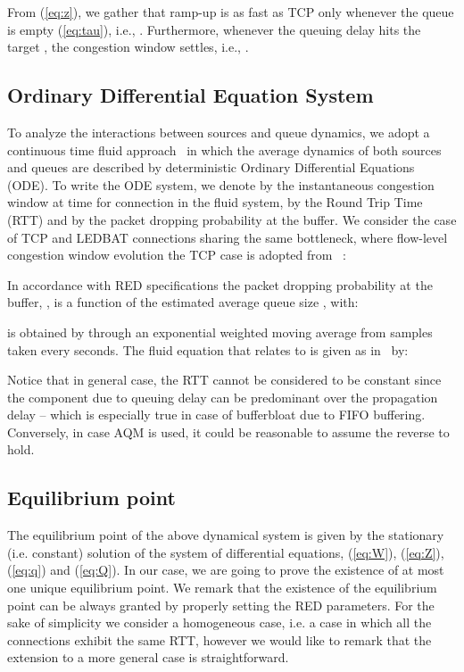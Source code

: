 \documentclass[conference]{IEEEtran}
\newcommand{\eqR}[1]{(\ref{eq:#1})}
\begin{document}
From \eqR{z}, we gather that ramp-up is as fast as TCP only whenever the queue is empty \eqR{tau}, i.e.,  . Furthermore, whenever the queuing delay hits the target ,  the congestion window settles, i.e., .


\subsection{Ordinary Differential Equation System} 

To analyze the interactions between sources and queue dynamics, we adopt a continuous time fluid approach~\cite{misra00sigcomm,hollot01infocom,liu03sigmetrics,marsan05ton} in which the average dynamics of both sources and queues are described by deterministic Ordinary Differential Equations (ODE).
To write the ODE system, we denote by  the instantaneous congestion window at time  for connection  in the fluid system, by  the Round Trip Time (RTT) and by  the packet dropping probability at the buffer. We consider the case of  TCP and  LEDBAT connections sharing the same bottleneck, where flow-level congestion window evolution the TCP case is adopted from ~\cite{misra00sigcomm}:


In accordance with RED specifications the packet dropping probability at the buffer, , is a function  of the estimated average queue size , with: 

 is obtained by  through an exponential weighted moving average from samples taken every  seconds.
The fluid equation that relates  to  is given as in~\cite{misra00sigcomm} by:


Notice that in general case, the RTT  cannot be considered to be constant since  the component due to queuing delay can be predominant over the propagation delay  -- which is especially true in case of  bufferbloat due to FIFO buffering. Conversely, in case AQM is used, it could be reasonable to assume the reverse  to hold.



\subsection{Equilibrium point} 



The equilibrium point  of the above dynamical system is  given by the stationary (i.e. constant) solution   of the system of differential equations, (\ref{eq:W}), (\ref{eq:Z}), (\ref{eq:q}) and (\ref{eq:Q}).
In our case, we are going to prove the existence of at most one unique equilibrium point. We remark that the existence of the equilibrium point can be always granted by properly setting the RED parameters.
For the sake of simplicity we consider a homogeneous case, i.e. a case in which all the connections exhibit the same RTT, however we would like to remark that the extension to a more general case is straightforward. 
\end{document}
